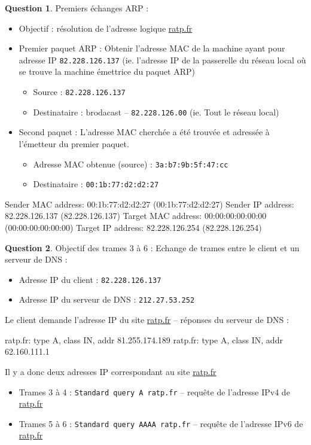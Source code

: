 \documentclass[11pt,english,french]{scrreprt}
\theoremstyle{remark}
\theoremstyle{definition}
\newtheorem{ques}{Question}[section]
\begin{document}
\begin{ques}
	Premiers échanges ARP :\begin{itemize}
		\item Objectif : résolution de l'adresse logique \url{ratp.fr}
		\item Premier paquet ARP : Obtenir l'adresse MAC de la machine ayant pour adresse IP \lstinline!82.228.126.137! (ie. l'adresse IP de la passerelle du réseau local où se trouve la machine émettrice du paquet ARP)\begin{itemize}
			\item Source : \lstinline!82.228.126.137!
			\item Destinataire : brodacast -- \lstinline!82.228.126.00! (ie. Tout le réseau local)
		\end{itemize}
		\item Second paquet : L'adresse MAC cherchée a été trouvée et adressée à l'émetteur du premier paquet.\begin{itemize}
			\item Adresse MAC obtenue (source) : \lstinline!3a:b7:9b:5f:47:cc!
			\item Destinataire : \lstinline!00:1b:77:d2:d2:27!
		\end{itemize}
	\end{itemize}
\begin{verbatimtab}
Sender MAC address: 00:1b:77:d2:d2:27 (00:1b:77:d2:d2:27)
Sender IP address: 82.228.126.137 (82.228.126.137)
Target MAC address: 00:00:00:00:00:00 (00:00:00:00:00:00)
Target IP address: 82.228.126.254 (82.228.126.254)
\end{verbatimtab}
\end{ques}

\begin{ques}
	Objectif des trames 3 à 6 :	Echange de trames entre le client et un serveur de DNS :\begin{itemize}
		\item Adresse IP du client : \lstinline!82.228.126.137!
		\item Adresse IP du serveur de DNS : \lstinline!212.27.53.252!
	\end{itemize}
	
	Le client demande l'adresse IP du site \url{ratp.fr} -- réponses du serveur de DNS : 
\begin{verbatimtab}
ratp.fr: type A, class IN, addr 81.255.174.189
ratp.fr: type A, class IN, addr 62.160.111.1	
\end{verbatimtab}
	
	Il y a donc deux adresses IP correspondant au site \url{ratp.fr}

	\begin{itemize}
		\item Trames 3 à 4 : \lstinline!Standard query A ratp.fr! -- requête de l'adresse IPv4 de \url{ratp.fr}
		\item Trames 5 à 6 : \lstinline!Standard query AAAA ratp.fr! -- requête de l'adresse IPv6 de \url{ratp.fr}
	\end{itemize}
\end{ques}
\end{document}
